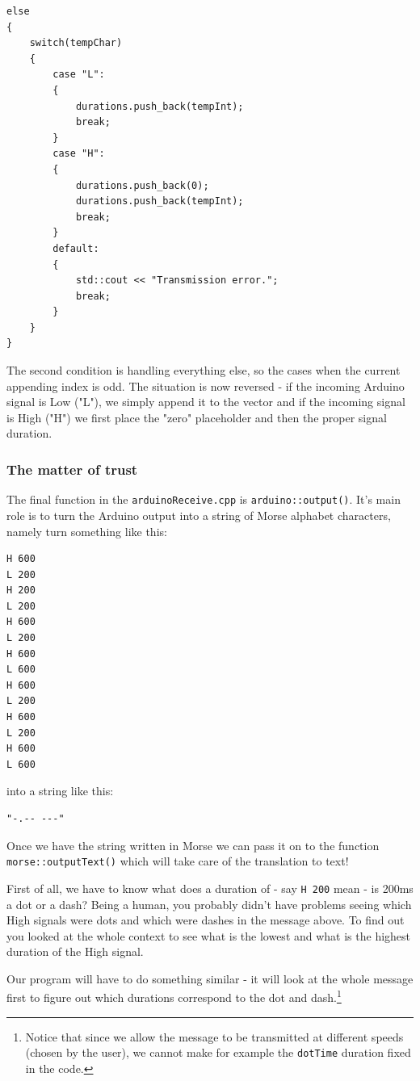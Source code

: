 \documentclass[12pt]{report}
\begin{document}
\begin{lstlisting}
else
{
	switch(tempChar)
	{
		case "L":
		{
			durations.push_back(tempInt);
			break;
		}
		case "H":
		{
			durations.push_back(0);
			durations.push_back(tempInt);
			break;
		}
		default:
		{
			std::cout << "Transmission error.";
			break;
		}
	}
}
\end{lstlisting}

The second condition is handling everything else, so the cases when the current appending index is odd. The situation is now reversed - if the incoming Arduino signal is Low ("L"), we simply append it to the vector and if the incoming signal is High ("H") we first place the "zero" placeholder and then the proper signal duration.

\subsubsection{The matter of trust}

The final function in the \texttt{arduinoReceive.cpp} is \texttt{arduino::output()}. It's main role is to turn the Arduino output into a string of Morse alphabet characters, namely turn something like this:

\begin{snugshade}
\begin{verbatim}
H 600
L 200
H 200
L 200
H 600
L 200
H 600
L 600
H 600
L 200
H 600
L 200
H 600
L 600
\end{verbatim}
\end{snugshade}

into a string like this:

\begin{snugshade}
\begin{verbatim}
"-.-- ---"
\end{verbatim}
\end{snugshade}

Once we have the string written in Morse we can pass it on to the function \texttt{morse::outputText()} which will take care of the translation to text!

First of all, we have to know what does a duration of - say \texttt{H 200} mean - is 200ms a dot or a dash? Being a human, you probably didn't have problems seeing which High signals were dots and which were dashes in the message above. To find out you looked at the whole context to see what is the lowest and what is the highest duration of the High signal.

Our program will have to do something similar - it will look at the whole message first to figure out which durations correspond to the dot and dash.\footnote{Notice that since we allow the message to be transmitted at different speeds (chosen by the user), we cannot make for example the \texttt{dotTime} duration fixed in the code.}
\end{document}
